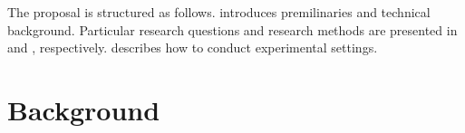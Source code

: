 The proposal is structured as follows.  introduces
premilinaries and technical background. Particular research questions and research methods are presented
in  and , respectively.
 describes how to conduct experimental settings.

\section{Background}\label{sec:background}




